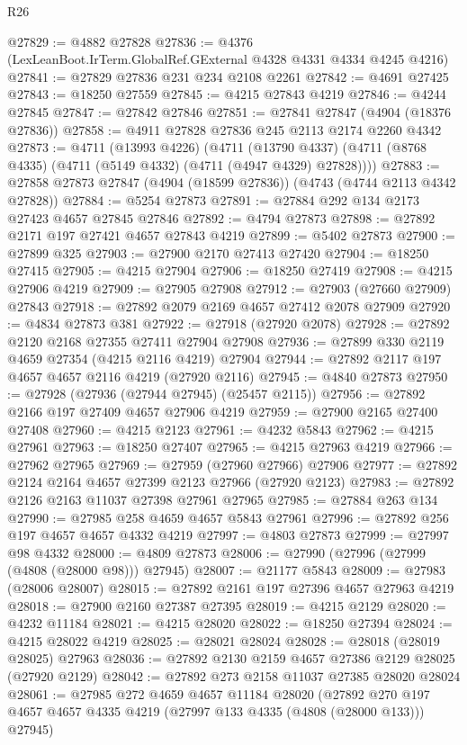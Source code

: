 \begin{lexlean}{R26}
\begin{coremodule}
@27829 := @4882 @27828
@27836 := @4376 (LexLeanBoot.IrTerm.GlobalRef.GExternal @4328 @4331 @4334 @4245 @4216)
@27841 := @27829 @27836 @231 @234 @2108 @2261
@27842 := @4691 @27425
@27843 := @18250 @27559
@27845 := @4215 @27843 @4219
@27846 := @4244 @27845
@27847 := @27842 @27846
@27851 := @27841 @27847 (@4904 (@18376 @27836))
@27858 := @4911 @27828 @27836 @245 @2113 @2174 @2260 @4342
@27873 := @4711
    (@13993 @4226)
    (@4711 (@13790 @4337) (@4711 (@8768 @4335) (@4711 (@5149 @4332) (@4711 (@4947 @4329) @27828))))
@27883 := @27858 @27873 @27847 (@4904 (@18599 @27836)) (@4743 (@4744 @2113 @4342 @27828))
@27884 := @5254 @27873
@27891 := @27884 @292 @134 @2173 @27423 @4657 @27845 @27846
@27892 := @4794 @27873
@27898 := @27892 @2171 @197 @27421 @4657 @27843 @4219
@27899 := @5402 @27873
@27900 := @27899 @325
@27903 := @27900 @2170 @27413 @27420
@27904 := @18250 @27415
@27905 := @4215 @27904
@27906 := @18250 @27419
@27908 := @4215 @27906 @4219
@27909 := @27905 @27908
@27912 := @27903 (@27660 @27909) @27843
@27918 := @27892 @2079 @2169 @4657 @27412 @2078 @27909
@27920 := @4834 @27873 @381
@27922 := @27918 (@27920 @2078)
@27928 := @27892 @2120 @2168 @27355 @27411 @27904 @27908
@27936 := @27899 @330 @2119 @4659 @27354 (@4215 @2116 @4219) @27904
@27944 := @27892 @2117 @197 @4657 @4657 @2116 @4219 (@27920 @2116)
@27945 := @4840 @27873
@27950 := @27928 (@27936 (@27944 @27945) (@25457 @2115))
@27956 := @27892 @2166 @197 @27409 @4657 @27906 @4219
@27959 := @27900 @2165 @27400 @27408
@27960 := @4215 @2123
@27961 := @4232 @5843
@27962 := @4215 @27961
@27963 := @18250 @27407
@27965 := @4215 @27963 @4219
@27966 := @27962 @27965
@27969 := @27959 (@27960 @27966) @27906
@27977 := @27892 @2124 @2164 @4657 @27399 @2123 @27966 (@27920 @2123)
@27983 := @27892 @2126 @2163 @11037 @27398 @27961 @27965
@27985 := @27884 @263 @134
@27990 := @27985 @258 @4659 @4657 @5843 @27961
@27996 := @27892 @256 @197 @4657 @4657 @4332 @4219
@27997 := @4803 @27873
@27999 := @27997 @98 @4332
@28000 := @4809 @27873
@28006 := @27990 (@27996 (@27999 (@4808 (@28000 @98))) @27945)
@28007 := @21177 @5843
@28009 := @27983 (@28006 @28007)
@28015 := @27892 @2161 @197 @27396 @4657 @27963 @4219
@28018 := @27900 @2160 @27387 @27395
@28019 := @4215 @2129
@28020 := @4232 @11184
@28021 := @4215 @28020
@28022 := @18250 @27394
@28024 := @4215 @28022 @4219
@28025 := @28021 @28024
@28028 := @28018 (@28019 @28025) @27963
@28036 := @27892 @2130 @2159 @4657 @27386 @2129 @28025 (@27920 @2129)
@28042 := @27892 @273 @2158 @11037 @27385 @28020 @28024
@28061 := @27985
    @272
    @4659
    @4657
    @11184
    @28020
    (@27892 @270 @197 @4657 @4657 @4335 @4219 (@27997 @133 @4335 (@4808 (@28000 @133))) @27945)

\end{coremodule}
\end{lexlean}
